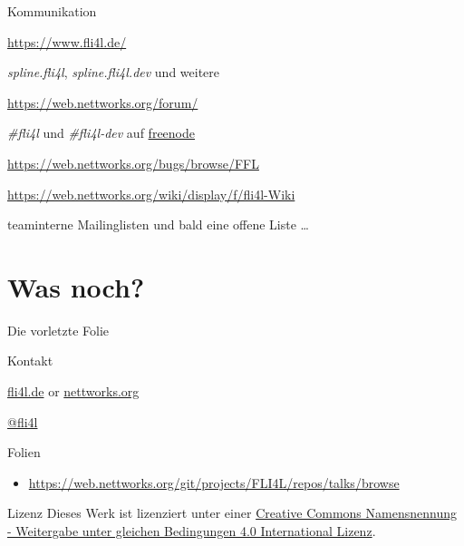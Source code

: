 \documentclass[t]{beamer}
\begin{document}
\begin{frame}{Kommunikation}
    \begin{description}[Newsgroups]
        \item[WWW] \url{https://www.fli4l.de/}
        \item[Newsgroups] \emph{spline.fli4l}, \emph{spline.fli4l.dev}
            und weitere
        \item[Forum] \url{https://web.nettworks.org/forum/}
        \item[IRC] \emph{\#fli4l} und \emph{\#fli4l-dev} auf
            \href{https://freenode.net/}{freenode}
        \item[Bugtracker] \url{https://web.nettworks.org/bugs/browse/FFL}
        \item[Wiki] \small
            \url{https://web.nettworks.org/wiki/display/f/fli4l-Wiki}
            \normalsize
        \item[E-Mail] teaminterne Mailinglisten und bald eine offene Liste …
    \end{description}
\end{frame}

\section*{Was noch?}

\begin{frame}{Die vorletzte Folie}
    \begin{block}{Kontakt}
        \begin{description}[Twitter]
            \item [WWW] \href{https://www.fli4l.de/}{fli4l.de} or
                    \href{https://www.nettworks.org/}{nettworks.org}
            \item [Twitter] \href{https://twitter.com/fli4l}{@fli4l}
        \end{description}
    \end{block}
    \begin{block}{Folien}
        \begin{itemize}
            \item \url{https://web.nettworks.org/git/projects/FLI4L/repos/talks/browse}
        \end{itemize}
    \end{block}
    \begin{block}{Lizenz}
        Dieses Werk ist lizenziert unter einer
        \href{http://creativecommons.org/licenses/by-sa/4.0/}{Creative Commons
        Namensnennung - Weitergabe unter gleichen Bedingungen 4.0 International
        Lizenz}.
    \end{block}
\end{frame}
\end{document}
